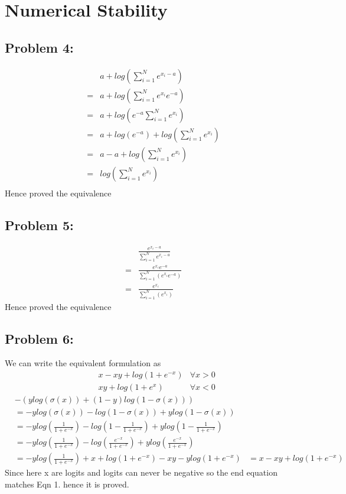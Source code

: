 \documentclass[5pt,a4paper]{article}
\begin{document}
	\section{ Numerical Stability}
	\subsection*{Problem 4:}
	\begin{eqnarray*}
	&a+log(\sum_{i=1}^{N}e^{x_i-a})\\
	=&a+log(\sum_{i=1}^{N}e^{x_i}e^{-a})\\
	=&a+log(e^{-a}\sum_{i=1}^{N}e^{x_i})\\
	=&a+log(e^{-a})+log(\sum_{i=1}^{N}e^{x_i})\\
	=&a-a+log(\sum_{i=1}^{N}e^{x_i})\\
	=&log(\sum_{i=1}^{N}e^{x_i})\\
	\end{eqnarray*}
	Hence proved the equivalence
	
	\subsection*{Problem 5:}
	\begin{eqnarray*}
		&\frac{e^{x_i-a}}{\sum_{i=1}^{N}e^{x_i-a}}\\
		=&\frac{e^{x_i}e^{-a}}{\sum_{i=1}^{N}(e^{x_i}e^{-a})}\\
		=&\frac{e^{x_i}}{\sum_{i=1}^{N}(e^{x_i})}
	\end{eqnarray*}
	Hence proved the equivalence
	
	\subsection*{Problem 6:}
	We can write the equivalent formulation as
	\begin{eqnarray}
		&x-xy+log(1+e^{-x})&\forall x>0\\
		&xy+log(1+e^{x})&\forall x<0
	\end{eqnarray}
	\begin{eqnarray*}
	&-(y log(\sigma(x))+(1-y)log(1-\sigma(x)))\\
	&=-y log(\sigma(x))-log(1-\sigma(x))+y log(1-\sigma(x))\\
	&=-y log(\frac{1}{1+e^{-x}})-log(1-\frac{1}{1+e^{-x}})+y log(1-\frac{1}{1+e^{-x}})\\
	&=-y log(\frac{1}{1+e^{-x}})-log(\frac{e^{-x}}{1+e^{-x}})+ylog(\frac{e^{-x}}{1+e^{-x}})\\
	&=-y log(\frac{1}{1+e^{-x}})+x+log(1+e^{-x})-xy-ylog(1+e^{-x})
	&=x-xy+log(1+e^{-x})
	\end{eqnarray*}
	Since here x are logits and logits can never be negative so the end equation matches Eqn 1. hence it is proved.
\end{document}

